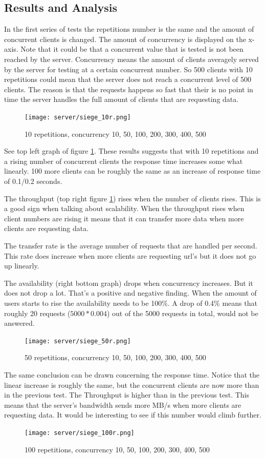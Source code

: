 \subsection{Results and Analysis}
In the first series of tests the repetitions number is the same and the amount of concurrent clients is changed. The amount of concurrency is displayed on the x-axis. Note that it could be that a concurrent value that is tested is not been reached by the server. Concurrency means the amount of clients averagely served by the server for testing at a certain concurrent number. So 500 clients with 10 repetitions could mean that the server does not reach a concurrent level of 500 clients. The reason is that the requests happens so fast that their is no point in time the server handles the full amount of clients that are requesting data.
\begin{figure}[H]
\center
\texttt{[image: server/siege\_10r.png]}
\caption{10 repetitions, concurrency 10, 50, 100, 200, 300, 400, 500}
\label{fig:10r}
\end{figure}
See top left graph of figure \ref{fig:10r}. These results suggests that with 10 repetitions and a rising number of concurrent clients the response time increases some what linearly.  100 more clients can be roughly the same as an increase of response time of 0.1/0.2 seconds. 

The throughput (top right figure \ref{fig:10r}) rises when the number of clients rises. This is a good sign when talking about scalability. When the throughput rises when client numbers are rising it means that it can transfer more data when more clients are requesting data. 

The transfer rate is the average number of requests that are handled per second. This rate does increase when more clients are requesting url's but it does not go up linearly.

The availability (right bottom graph) drops when concurrency increases. But it does not drop a lot. That's a positive and negative finding. When the amount of users starts to rise the availability needs to be 100\%. A drop of 0.4\% means that roughly 20 requests ($5000 * 0.004$) out of the 5000 requests in total, would not be answered. 

\vspace{0.5cm}
\begin{figure}[H]
\center
\texttt{[image: server/siege\_50r.png]}
\caption{50 repetitions, concurrency 10, 50, 100, 200, 300, 400, 500}
\end{figure}
The same conclusion can be drawn concerning the response time. Notice that the linear increase is roughly the same, but the concurrent clients are now more than in the previous test.
The Throughput is higher than in the previous test. This means that the server's bandwidth sends more MB/s when more clients are requesting data. It would be interesting to see if this number would climb further.
\begin{figure}[H]
\center
\texttt{[image: server/siege\_100r.png]}
\caption{100 repetitions, concurrency 10, 50, 100, 200, 300, 400, 500}
\end{figure}

